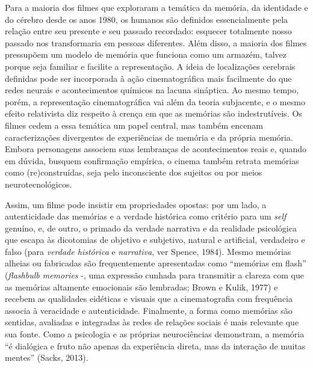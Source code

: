 Para a maioria dos filmes que exploraram a temática da memória, da
identidade e do cérebro desde os anos 1980, os humanos são definidos
essencialmente pela relação entre seu presente e seu passado recordado:
esquecer totalmente nosso passado nos transformaria em pessoas
diferentes. Além disso, a maioria dos filmes pressupõem um modelo de
memória que funciona como um armazém, talvez porque seja familiar e
facilite a representação. A ideia de localizações cerebrais definidas
pode ser incorporada à ação cinematográfica mais facilmente do que redes
neurais e acontecimentos químicos na lacuna sináptica. Ao mesmo tempo,
porém, a representação cinematográfica vai além da teoria subjacente, e
o mesmo efeito relativista diz respeito à crença em que as memórias são
indestrutíveis. Os filmes cedem a essa temática um papel central, mas
também encenam caracterizações divergentes de experiências de memória e
da própria memória. Embora personagens associem suas lembranças de
acontecimentos reais e, quando em dúvida, busquem confirmação empírica,
o cinema também retrata memórias como (re)construídas, seja pelo
inconsciente dos sujeitos ou por meios neurotecnológicos.

Assim, um filme pode insistir em propriedades opostas: por um lado, a
autenticidade das memórias e a verdade histórica como critério para um
\emph{self} genuíno, e, de outro, o primado da verdade narrativa e da realidade
psicológica que escapa às dicotomias de objetivo e subjetivo, natural e
artificial, verdadeiro e falso (para \emph{verdade histórica} e
\emph{narrativa}, ver Spence, 1984). Mesmo memórias alheias ou
fabricadas são frequentemente apresentadas como ``memórias em flash''
(\emph{flashbulb memories} -, uma expressão cunhada para transmitir a
clareza com que as memórias altamente emocionais são lembradas; Brown e
Kulik, 1977) e recebem as qualidades eidéticas e visuais que a
cinematografia com frequência associa à veracidade e autenticidade.
Finalmente, a forma como memórias são sentidas, avaliadas e integradas
às redes de relações sociais é mais relevante que sua fonte. Como a
psicologia e as próprias neurociências demonstram, a memória ``é
dialógica e fruto não apenas da experiência direta, mas da interação de
muitas mentes'' (Sacks, 2013).

